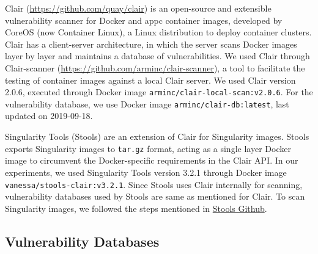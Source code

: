 \documentclass[a4paper,num-refs]{oup-contemporary}
\begin{document}
Clair (\url{https://github.com/quay/clair}) is an open-source and extensible
vulnerability scanner for Docker and appc container images, developed by
CoreOS (now Container Linux), a Linux distribution to deploy container
clusters. Clair has a client-server architecture, in which the server
scans Docker images layer by layer and maintains a database of vulnerabilities. We used Clair through Clair-scanner
(\url{https://github.com/arminc/clair-scanner}), a tool to facilitate the testing
of container images against a local Clair server. 
We used Clair version 2.0.6, executed through
Docker image \texttt{arminc/clair-local-scan:v2.0.6}. For the vulnerability
database, we use Docker image \texttt{arminc/clair-db:latest}, last
updated on 2019-09-18.

Singularity Tools (Stools)
are an extension of Clair for Singularity images. Stools
exports Singularity images to \texttt{tar.gz} format, acting as a single layer Docker image
to circumvent the Docker-specific requirements in the Clair API.
In our experiments, we used Singularity Tools version 3.2.1 through Docker
image
\texttt{vanessa/stools-clair:v3.2.1}.
Since Stools uses Clair internally for scanning, vulnerability databases used
by Stools are same as mentioned for Clair.
To scan Singularity images, we followed the steps mentioned in
\href{https://github.com/singularityhub/stools}{Stools Github}.

\subsection{Vulnerability Databases}
\end{document}
